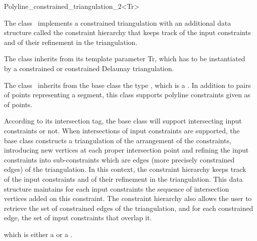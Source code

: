 
\begin{ccRefClass}{Polyline_constrained_triangulation_2<Tr>}


The class \ccRefName\ 
implements a constrained triangulation 
with an additional data
structure called the  constraint hierarchy 
that keeps track of  the input constraints and of their refinement
in the triangulation.

The class 
inherits from its template parameter Tr, which has to be instantiated
by a constrained or constrained Delaunay  triangulation.

The class \ccRefName\ inherits from the base class the type ,
which is a \ccc{std::pair<Point,Point>}. In addition to pairs
of points representing a segment, this class supports polyline constraints 
given as \ccc{Range} of points. 

According to its intersection tag, the base class
will support intersecting input constraints or not.
When intersections of input constraints are supported,
the base class constructs a triangulation  of the  arrangement
of the constraints,
introducing new vertices at each proper intersection
point and  refining the input constraints into sub-constraints
which are edges (more precisely constrained edges) of the
triangulation. 
In this context, the constraint hierarchy 
keeps track of  the input constraints and of their refinement
in the triangulation. This data structure 
maintains for each input constraints 
the sequence of intersection vertices added on this constraint.
The constraint hierarchy also allows the user to retrieve the set
of constrained edges of the triangulation, and for each
constrained edge,  the set of input constraints that overlap it.


\ccInheritsFrom
{} which is either a  or a .

\ccTypes 
{}




\end{ccRefClass}
